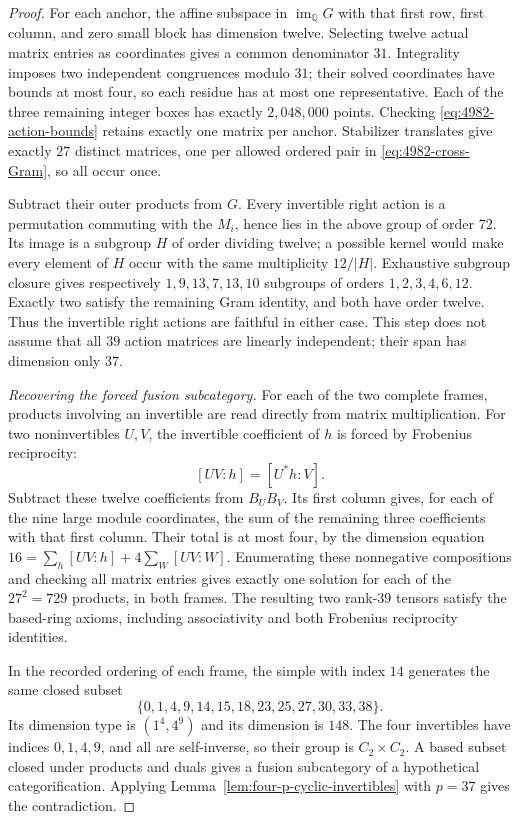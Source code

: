 \begin{proof}
For each anchor, the affine subspace in
$\operatorname{im}_{\mathbb Q}G$ with that first row, first column,
and zero small block has dimension twelve. Selecting twelve actual
matrix entries as coordinates gives a common denominator $31$.
Integrality imposes two independent congruences modulo $31$; their
solved coordinates have bounds at most four, so each residue has
at most one representative. Each of the three remaining integer
boxes has exactly $2{,}048{,}000$ points. Checking \eqref{eq:4982-action-bounds} retains
exactly one matrix per anchor. Stabilizer translates give exactly
$27$ distinct matrices, one per allowed ordered pair in \eqref{eq:4982-cross-Gram}, so all
occur once.

Subtract their outer products from $G$. Every invertible right
action is a permutation commuting with the $M_i$, hence lies in
the above group of order $72$. Its image is a subgroup $H$ of order
dividing twelve; a possible kernel would make every element of $H$
occur with the same multiplicity $12/|H|$. Exhaustive subgroup
closure gives respectively $1,9,13,7,13,10$ subgroups of orders
$1,2,3,4,6,12$. Exactly two satisfy the remaining Gram identity,
and both have order twelve. Thus the invertible right actions are
faithful in either case. This step does not assume that all $39$
action matrices are linearly independent; their span has dimension
only $37$.

\emph{Recovering the forced fusion subcategory.}
For each of the two complete frames, products involving an
invertible are read directly from matrix multiplication. For two
noninvertibles $U,V$, the invertible coefficient of $h$ is forced
by Frobenius reciprocity:
\[
 [UV:h]=[U^*h:V].
\]
Subtract these twelve coefficients from $B_UB_V$. Its first
column gives, for each of the nine large module coordinates, the
sum of the remaining three coefficients with that first column.
Their total is at most four, by the dimension equation
$16=\sum_h[UV:h]+4\sum_W[UV:W]$.
Enumerating these nonnegative compositions and checking all matrix
entries gives exactly one solution for each of the $27^2=729$
products, in both frames. The resulting two rank-$39$ tensors
satisfy the based-ring axioms, including associativity and both
Frobenius reciprocity identities.

In the recorded ordering of each frame, the simple with index $14$
generates the same closed subset
\[
 \{0,1,4,9,14,15,18,23,25,27,30,33,38\}.
\]
Its dimension type is $(1^4,4^9)$ and its dimension is $148$.
The four invertibles have indices $0,1,4,9$, and all are
self-inverse, so their group is $C_2\times C_2$.
A based subset closed under products and duals gives a fusion
subcategory of a hypothetical categorification. Applying
Lemma~\ref{lem:four-p-cyclic-invertibles} with $p=37$ gives the
contradiction.


\end{proof}
